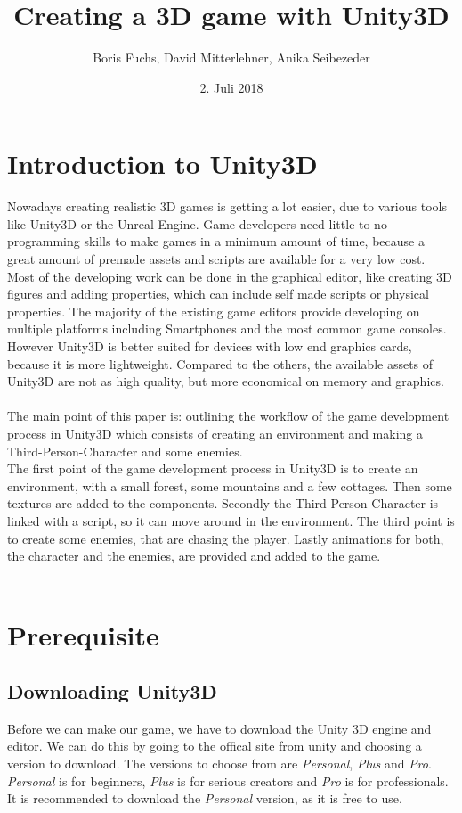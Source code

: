 \documentclass[12pt, a4paper, titlepage]{article}
\title{Creating a 3D game with Unity3D}
\date{2. Juli 2018}
\author{Boris Fuchs, David Mitterlehner, Anika Seibezeder}
\begin{document}
\maketitle
\tableofcontents 

\section{Introduction to Unity3D}
Nowadays creating realistic 3D games is getting a lot easier, due to various tools like Unity3D or the Unreal Engine. Game developers need little to no programming skills to make games in a minimum amount of time, because a great amount of premade assets and scripts are available for a very low cost. Most of the developing work can be done in the graphical editor, like creating 3D figures and adding properties, which can include self made scripts or physical properties. The majority of the existing game editors provide developing on multiple platforms including Smartphones and the most common game consoles. However Unity3D is better suited for devices with low end graphics cards, because it is more lightweight. Compared to the others, the available assets of Unity3D are not as high quality, but more economical on memory and graphics. \\ \\
The main point of this paper is: outlining the workflow of the game development process in Unity3D which consists of creating an environment and making a Third-Person-Character and some enemies.  \\
The first point of the game development process in Unity3D is to create an environment, with a small forest, some mountains and a few cottages. Then some textures are added to the components.
Secondly the Third-Person-Character is linked with a  script, so it can move around in the environment.
The third point is to create some enemies, that are chasing the player. 
Lastly animations for both, the character and the enemies, are provided and added to the game. \\ \\

\section{Prerequisite}
\subsection{Downloading Unity3D}
Before we can make our game, we have to download the Unity 3D engine and editor. We can do this by going to the offical site from unity \cite{b4} and choosing a version to download. The versions to choose from are \emph{Personal}, \emph{Plus} and \emph{Pro}. \emph{Personal} is for beginners, \emph{Plus} is for serious creators and \emph{Pro} is for professionals. It is recommended to download the \emph{Personal} version, as it is free to use.
\end{document}
